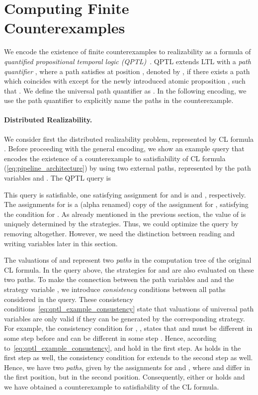 \documentclass{LMCS}
\theoremstyle{plain}\newtheorem{theorem}[thm]{Theorem}
\theoremstyle{plain}\newtheorem{lemma}[thm]{Lemma}
\theoremstyle{plain}\newtheorem{proposition}[thm]{Proposition}
\theoremstyle{plain}\newtheorem{corollary}[thm]{Corollary}
\theoremstyle{definition}\newtheorem{definition}{Definition}[section]
\begin{document}
\section{Computing Finite Counterexamples} \label{sec:computing_counterexamples}


We encode the existence of finite counterexamples to realizability as a formula of \emph{quantified propositional temporal logic (QPTL)}~\cite{DBLP:conf/lics/KestenP95}. 
QPTL extends LTL with a \emph{path quantifier} , where a path  satisfies  at position , denoted by , if there exists a path  which coincides with  except for the newly introduced atomic proposition , such that .
We define the universal path quantifier  as .
In the following encoding, we use the path quantifier to explicitly name the paths in the counterexample.

\paragraph{\bf Distributed Realizability.} \label{sec:algorithm_incomplete_information}


We consider first the distributed realizability problem, represented by CL formula .
Before proceeding with the general encoding, we show an example query that encodes the existence of a counterexample to satisfiability of CL formula (\ref{eq:pipeline_architecture})  by using two external paths, represented by the path variables  and .
The QPTL query is

This query is satisfiable, one satisfying assignment for  and  is  and , respectively.
The assignments for  is a (alpha renamed) copy of the assignment for , satisfying the condition  for .
As already mentioned in the previous section, the value of  is uniquely determined by the strategies.
Thus, we could optimize the query by removing  altogether.
However, we need the distinction between reading and writing variables later in this section.

The valuations of  and  represent two \emph{paths} in the computation tree of the original CL formula.
In the query above, the strategies for  and  are also evaluated on these two paths.
To make the connection between the path variables  and  and the strategy variable , we introduce \emph{consistency} conditions between all paths considered in the query.
These consistency conditions~\eqref{eq:qptl_example_consustency} state that valuations of universal path variables are only valid if they can be generated by the corresponding strategy.
For example, the consistency condition for , , states that  and  must be different in some step  before  and  can be different in some step .
Hence, according to~\eqref{eq:qptl_example_consustency},  and  hold in the first step.
As  holds in the first step as well, the consistency condition for  extends to the second step as well.
Hence, we have two \emph{paths}, given by the assignments for  and , where  and  differ in the first position, but  in the second position.
Consequently, either  or  holds and we have obtained a counterexample to satisfiability of the CL formula.
\end{document}
